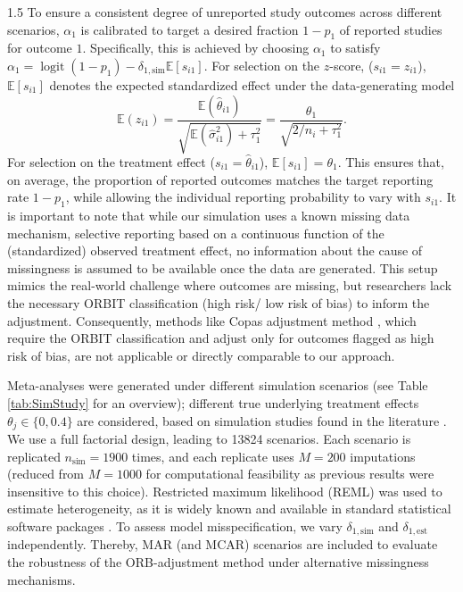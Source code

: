 \documentclass{article}
\begin{document}
\begin{spacing}{1.5}
To ensure a consistent degree of unreported study outcomes across different scenarios, $\alpha_1$ is calibrated to target a desired fraction $1 - p_1$ of reported studies for outcome $1$. Specifically, this is achieved by choosing $\alpha_1$ to satisfy
$\alpha_1 = \operatorname{logit}\!\left(1 - p_1 \right) - \delta_{1,\text{sim}} \mathbb{E}[s_{i1}]$. For selection on the $z$-score, ($s_{i1} = z_{i1}$), $\mathbb{E}[s_{i1}]$ denotes the expected standardized effect under the data-generating model
\begin{equation*}
    \mathbb{E}(z_{i1}) = 
    \frac{\mathbb{E}(\hat \theta_{i1})}{\sqrt{\mathbb{E}(\hat\sigma^2_{i1}) + \tau^2_1}} =
    \frac{\theta_{1}}{\sqrt{2/n_i + \tau^2_1}}.
\end{equation*}
For selection on the treatment effect ($s_{i1} = \hat\theta_{i1}$), $\mathbb{E}[s_{i1}] = \theta_1$. This ensures that, on average, the proportion of reported outcomes matches the target reporting rate $1 - p_1$, while allowing the individual reporting probability to vary with $s_{i1}$.
It is important to note that while our simulation uses a known missing data mechanism, \ie selective reporting based on a continuous function of the (standardized) observed treatment effect, no information about the cause of missingness is assumed to be available once the data are generated. This setup mimics the real-world challenge where outcomes are missing, but researchers lack the necessary ORBIT classification (\eg high risk/ low risk of bias) to inform the adjustment. Consequently, methods like Copas adjustment method \cite{copas2019model}, which require the ORBIT classification and adjust only for outcomes flagged as high risk of bias, are not applicable or directly comparable to our approach.

Meta-analyses were generated under different simulation scenarios (see Table \ref{tab:SimStudy} for an overview); \eg different true underlying treatment effects $\theta_j \in \{0, 0.4\}$ are considered, based on simulation studies found in the literature \cite{kirkham2012multivariate, saracini2025addressing}. We use a full factorial design, leading to 13824 scenarios. Each scenario is replicated $n_{\text{sim}}=1900$ times, and each replicate uses $M=200$ imputations (reduced from $M= 1000$ for computational feasibility as previous results were insensitive to this choice). Restricted maximum likelihood (REML) was used to estimate heterogeneity, as it is widely known and available in standard statistical software packages \cite{langan2019comparison, jackson2011multivariate, schmid2020handbook}. To assess model misspecification, we vary $\delta_{1,\text{sim}}$ and $\delta_{1,\text{est}}$ independently. Thereby, MAR (and MCAR) scenarios are included to evaluate the robustness of the ORB-adjustment method under alternative missingness mechanisms.


\end{spacing}
\end{document}
